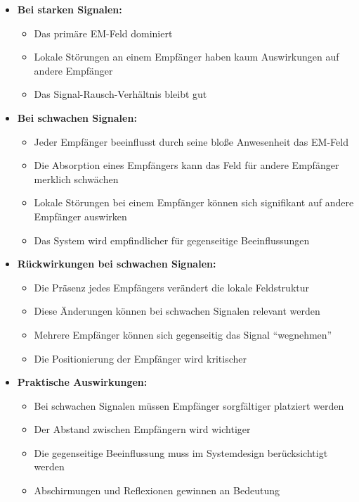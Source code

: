 \documentclass[12pt,a4paper]{article}
\begin{document}
	\begin{itemize}
		\item \textbf{Bei starken Signalen:}
		\begin{itemize}
			\item Das primäre EM-Feld dominiert
			\item Lokale Störungen an einem Empfänger haben kaum Auswirkungen auf andere Empfänger
			\item Das Signal-Rausch-Verhältnis bleibt gut
		\end{itemize}
		
		\item \textbf{Bei schwachen Signalen:}
		\begin{itemize}
			\item Jeder Empfänger beeinflusst durch seine bloße Anwesenheit das EM-Feld
			\item Die Absorption eines Empfängers kann das Feld für andere Empfänger merklich schwächen
			\item Lokale Störungen bei einem Empfänger können sich signifikant auf andere Empfänger auswirken
			\item Das System wird empfindlicher für gegenseitige Beeinflussungen
		\end{itemize}
		
		\item \textbf{Rückwirkungen bei schwachen Signalen:}
		\begin{itemize}
			\item Die Präsenz jedes Empfängers verändert die lokale Feldstruktur
			\item Diese Änderungen können bei schwachen Signalen relevant werden
			\item Mehrere Empfänger können sich gegenseitig das Signal ``wegnehmen''
			\item Die Positionierung der Empfänger wird kritischer
		\end{itemize}
		
		\item \textbf{Praktische Auswirkungen:}
		\begin{itemize}
			\item Bei schwachen Signalen müssen Empfänger sorgfältiger platziert werden
			\item Der Abstand zwischen Empfängern wird wichtiger
			\item Die gegenseitige Beeinflussung muss im Systemdesign berücksichtigt werden
			\item Abschirmungen und Reflexionen gewinnen an Bedeutung
		\end{itemize}
	\end{itemize}
	
\end{document}
